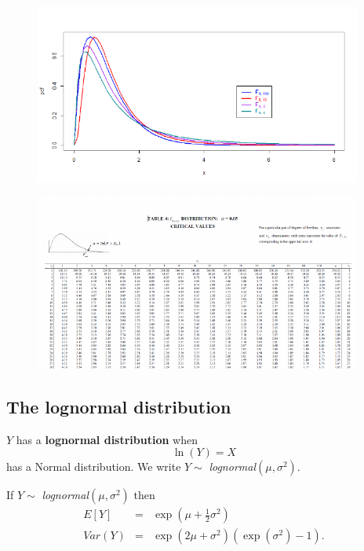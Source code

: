 \documentclass[notes=show,smaller,handout]{beamer}\usepackage[]{graphicx}\usepackage[]{color}
\begin{document}
\begin{frame}{\subsecname}

  \begin{figure}[ptb]\centering
  \includegraphics[height=2.3324in, width=4.2462in]{img/F-dist_pds__6.pdf}%
  \end{figure}%
\end{frame}%

\begin{frame}
  \begin{figure}[ptb]\centering
  \includegraphics[height=2.2753in, width=4.2263in]{img/Fdist_table__7.pdf}%
  \end{figure}
\end{frame}%

\subsection{The lognormal distribution}

\begin{frame}{\subsecname}
  \begin{definition}
   $Y$ has a \textbf{lognormal distribution} when
   $$\ln \left( Y\right) =X$$
  has a Normal distribution. We write $Y\sim $ \emph{lognormal}$\left( \mu ,\sigma ^{2}\right) $.
  \end{definition}

  \medskip

  If $Y\sim $ \emph{lognormal}$\left( \mu ,\sigma ^{2}\right) $ then%
  \begin{eqnarray*}
  E\left[ Y\right] &=&\exp{ \left( \mu +\frac{1}{2}\sigma ^{2}\right)} \\
  Var(Y) &=&\exp{ \left( 2\mu +\sigma ^{2}\right)} \left( \exp{ \left( \sigma
  ^{2}\right)} -1\right).
  \end{eqnarray*}
\end{frame}
\end{document}
